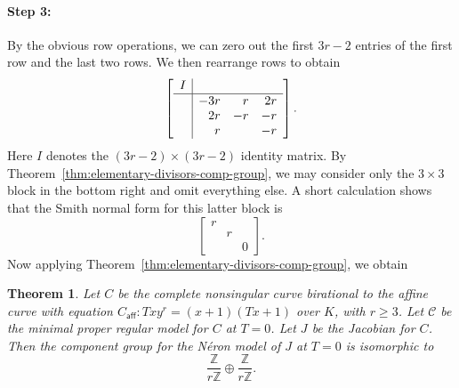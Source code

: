 \documentclass[pagesize,paper=letter]{scrartcl}
\newcommand{\scd}{\mathscr{C}}
\newcommand{\caff}{C_{\textsf{aff}}}
\theoremstyle{plain}
\newtheorem{theorem}{Theorem}[section]
\theoremstyle{definition}
\theoremstyle{remark}
\newcommand{\Z}{\ensuremath{\mathbb{Z}}}
\begin{document}
\paragraph{Step 3:}
\label{sec:step-3}

By the obvious row operations, we can zero out the first $3r-2$ entries of the first row and the last two rows. We then rearrange rows to obtain
\[
\left[\begin{array}{c|rrr}
  I & & & \\ \hline
  & -3r & r & 2r \\
  & 2r & -r & -r \\
  & r & & -r
\end{array}\right].
\]
Here $I$ denotes the $(3r-2) \times (3r-2)$ identity matrix. By Theorem~\ref{thm:elementary-divisors-comp-group}, we may consider only the $3 \times 3$ block in the bottom right and omit everything else. A short calculation shows that the Smith normal form for this latter block is
\[
\begin{bmatrix}
  r & & \\
  & r & \\
  & & 0
\end{bmatrix}.
\]
Now applying Theorem~\ref{thm:elementary-divisors-comp-group}, we obtain
\begin{theorem}
  Let $C$ be the complete nonsingular curve birational to the affine curve with equation $\caff:Txy^r = (x+1)(Tx+1)$ over $K$, with $r \geq 3$. Let $\scd$ be the minimal proper regular model for $C$ at $T = 0$. Let $J$ be the Jacobian for $C$. Then the component group for the N\'eron model of $J$ at $T = 0$ is isomorphic to
  \[
  \frac{\Z}{r\Z} \oplus \frac{\Z}{r\Z}.
  \]
\end{theorem}




\end{document}
